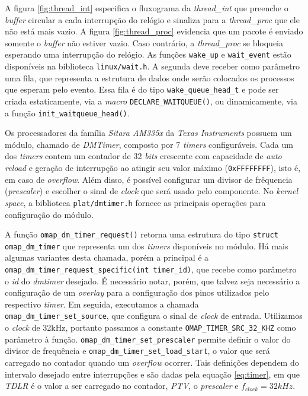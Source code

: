 	\FloatBarrier 

A figura \ref{fig:thread_int} especifica o fluxograma da \textit{thread\_int}
que preenche o \textit{buffer} circular a cada interrupção do relógio e sinaliza
para a \textit{thread\_proc} que ele não está mais vazio. A figura
\ref{fig:thread_proc} evidencia que um pacote é enviado somente o
\textit{buffer} não estiver vazio. Caso contrário, a \textit{thread\_proc}
se bloqueia esperando uma interrupção do relógio. As funções \texttt{wake\_up} e
\texttt{wait\_event} estão disponíveis na biblioteca \texttt{linux/wait.h}. A
segunda deve receber como parâmetro uma fila, que representa a estrutura de
dados onde serão colocados os processos que esperam pelo evento. Essa fila é do
tipo \texttt{wake\_queue\_head\_t} e pode ser criada estaticamente, via
a \textit{macro} \texttt{DECLARE\_WAITQUEUE()}, ou dinamicamente, via a função
\texttt{init\_waitqueue\_head()}.

\vspace{12pt}

Os processadores da família \textit{Sitara AM335x} da \textit{Texas Instruments}
possuem um módulo, chamado de \textit{DMTimer}, composto por 7 \textit{timers}
configuráveis. Cada um dos \textit{timers} contem um contador de 32
\textit{bits} crescente com capacidade de \textit{auto reload} e geração de
interrupção ao atingir seu valor máximo (\texttt{0xFFFFFFFF}), isto é, em caso
de \textit{overflow}. Além disso, é possível configurar um divisor de frêquencia
(\textit{prescaler}) e escolher o sinal de \textit{clock} que será usado pelo
componente. No \textit{kernel space}, a biblioteca \texttt{plat/dmtimer.h}
fornece as principais operações para configuração do módulo. 

\vspace{12pt}

A função \texttt{omap\_dm\_timer\_request()} retorna uma estrutura do tipo
\texttt{struct omap\_dm\_timer} que representa um dos \textit{timers}
disponíveis no módulo. Há mais algumas variantes desta chamada, porém a
principal é a \texttt{omap\_dm\_timer\_request\_specific(int timer\_id)}, que
recebe como parâmetro o \textit{id} do \textit{dmtimer} desejado. É necessário
notar, porém, que talvez seja necessário a configuração de um \textit{overlay}
para a configuração dos pinos utilizados pelo respectivo \textit{timer}. Em
seguida, executamos a chamada \texttt{omap\_dm\_timer\_set\_source}, que
configura o sinal de \textit{clock} de entrada. Utilizamos o \textit{clock} de
32kHz, portanto passamos a constante \texttt{OMAP\_TIMER\_SRC\_32\_KHZ} como
parâmetro à função. \texttt{omap\_dm\_timer\_set\_prescaler} permite definir o
valor do divisor de frequência e \texttt{omap\_dm\_timer\_set\_load\_start}, o
valor que será carregado no contador quando um \textit{overflow} ocorrer. Tais
definições dependem do intervalo desejado entre interrupções e são dadas pela
equação \ref{eq:timer}, em que \textit{TDLR} é o valor a ser carregado no
contador, \textit{PTV}, o \textit{prescaler} e \(f_{clock}=32kHz\).

